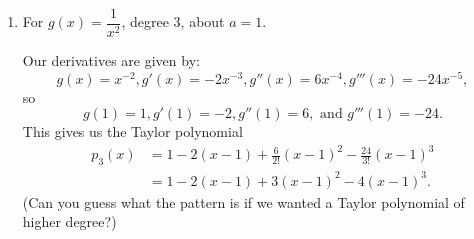 \documentclass[12pt]{article}
\begin{document}
\begin{enumerate}
\begin{enumerate}
 \medskip
 
 
 \item For $g(x) = \dfrac{1}{x^2}$, degree 3, about $a=1$. 
 
 \medskip
 
 Our derivatives are given by:
 \[
 g(x) = x^{-2}, g'(x) = -2x^{-3}, g''(x) = 6x^{-4}, g'''(x) = -24x^{-5},
 \]
 so
 \[
 g(1) = 1, g'(1)=-2, g''(1) = 6, \text{ and } g'''(1) = -24.
 \]
 This gives us the Taylor polynomial
 \begin{align*}
 p_3(x) &= 1-2(x-1)+\frac{6}{2!}(x-1)^2-\frac{24}{3!}(x-1)^3\\
 & = 1-2(x-1)+3(x-1)^2-4(x-1)^3.
 \end{align*}
 (Can you guess what the pattern is if we wanted a Taylor polynomial of higher degree?)
 \end{enumerate}
\end{enumerate}
\end{document}
